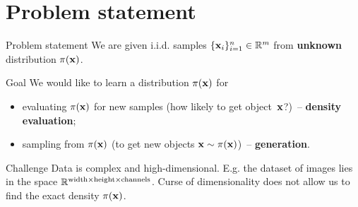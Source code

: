 \section{Problem statement}
\begin{frame}{Problem statement}
	We are given i.i.d. samples $\{\mathbf{x}_i\}_{i=1}^n \in \mathbb{R}^m$ from \textbf{unknown} distribution $\pi(\mathbf{x})$.
	
	\begin{block}{Goal}
		We would like to learn a distribution $\pi(\mathbf{x})$ for 
		\begin{itemize}
		    \item evaluating $\pi(\mathbf{x})$ for new samples (how likely to get object~$\mathbf{x}$?)~-- \textbf{density evaluation};
		    \item sampling from $\pi(\mathbf{x})$ (to get new objects $\mathbf{x} \sim \pi(\mathbf{x})$)~-- \textbf{generation}.
		\end{itemize}
	\end{block}
	\begin{block}{Challenge}
		 Data is complex and high-dimensional. E.g. the dataset of images lies in the space $\mathbb{R}^{\text{width} \times \text{height} \times \text{channels}}$. Curse of dimensionality does not allow us to find the exact density $\pi(\mathbf{x})$. 
	\end{block}
\end{frame}
